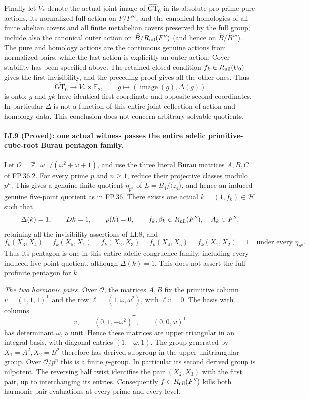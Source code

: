 Finally let $V_*$ denote the actual joint image of
$\widehat{\mathrm{GT}}_0$ in its absolute pro-prime pure
actions, its normalized full action on $F/F'''$, and the
canonical homologies of all finite abelian covers and all
finite metabelian covers preserved by the full group; include
also the canonical outer action on
$\widehat B/R_{\rm nil}(F'')$ (and hence on
$\widehat B/\widehat B'''$).
The pure and homology actions are the continuous genuine
actions from normalized pairs, while the last action is
explicitly an outer action. Cover stability has been
specified above. The retained closed condition
$f_k\in R_{\rm nil}(U_0)$ gives the first invisibility,
and the preceding proof gives all the other ones. Thus
\[
 \widehat{\mathrm{GT}}_0\longrightarrow V_*\times\mathbb F_2,
 \qquad g\longmapsto(\operatorname{image}(g),\Delta(g))
\]
is onto: $g$ and $gk$ have identical first coordinate and
opposite second coordinates. In particular $\Delta$ is not
a function of this entire joint collection of action and
homology data. This conclusion does not concern arbitrary
solvable quotients.

\paragraph{LI.9 (Proved): one actual witness passes the entire adelic primitive-cube-root Burau pentagon family.}
Let $\mathcal O=\mathbb Z[\omega]/(\omega^2+\omega+1)$,
and use the three literal Burau matrices $A,B,C$ of FP.36.2.
For every prime $p$ and $n\geq1$, reduce their projective
classes modulo $p^n$. This gives a genuine finite quotient
$\eta_{p^n}$ of $L=B_4/\langle z_4\rangle$, and hence an
induced genuine five-point quotient as in FP.36.
There exists one actual $k=(1,f_k)\in\mathcal H$ such that
\[
 \Delta(k)=1,\qquad Dk=1,\qquad\rho(k)=0,\qquad
 f_k,\beta_k\in R_{\rm nil}(F''),\quad A_k\in F'',
\]
retaining all the invisibility assertions of LI.8, and
\[
 f_k(X_3,X_4)=f_k(X_5,X_1)=f_k(X_2,X_3)
       =f_k(X_4,X_5)=f_k(X_1,X_2)=1
       \quad\text{under every }\eta_{p^n}.
\]
Thus its pentagon is one in this entire adelic congruence
family, including every induced five-point quotient, although
$\Delta(k)=1$. This does not assert the full profinite
pentagon for $k$.

\emph{The two harmonic pairs.}
Over $\mathcal O$, the matrices $A,B$ fix the primitive
column $v=(1,1,1)^{\mathsf T}$ and the row
$\ell=(1,\omega,\omega^2)$, with $\ell v=0$.
The basis with columns
\[
 v,\qquad(0,1,-\omega^2)^{\mathsf T},\qquad
                    (0,0,\omega)^{\mathsf T}
\]
has determinant $\omega$, a unit. Hence these matrices are
upper triangular in an integral basis, with diagonal entries
$(1,-\omega,1)$. The group generated by $X_1=A^2,X_2=B^2$
therefore has derived subgroup in the upper unitriangular
group. Over $\mathcal O/p^n$ this is a finite $p$-group.
In particular its second derived group is nilpotent.
The reversing half twist identifies the pair $(X_2,X_3)$
with the first pair, up to interchanging its entries.
Consequently $f\in R_{\rm nil}(F'')$ kills both harmonic
pair evaluations at every prime and every level.

